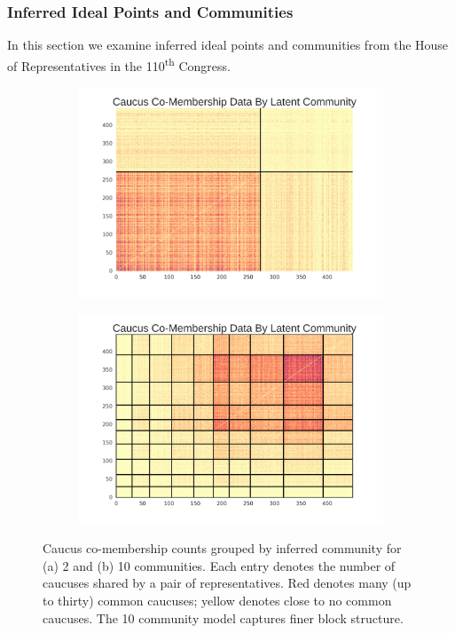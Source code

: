 \documentclass{article}
\begin{document}
\subsubsection{Inferred Ideal Points and Communities}
In this section we examine inferred ideal points and communities from the House of Representatives in the 110\textsuperscript{th} Congress.


\begin{figure}[h]
  \centering
    \begin{subfigure}[b]{0.45\textwidth}
        \includegraphics[width=\textwidth]{2_communities.png}
        \caption{}
    \end{subfigure}
    \begin{subfigure}[b]{0.45\textwidth}
        \includegraphics[width=\textwidth]{10_communities.png}
        \caption{}
    \end{subfigure}

  \caption{Caucus co-membership counts grouped by inferred community for (a) 2 and (b) 10 communities. Each entry denotes the number of caucuses shared by a pair of representatives. Red denotes many (up to thirty) common caucuses; yellow denotes close to no common caucuses. The 10 community model captures finer block structure.}
      \label{fig:2_comm_lcipm}
\end{figure}
\end{document}
